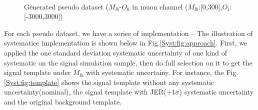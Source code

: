 		\begin{figure}[H]
		\centering
			\\
		\caption{Generated pseudo dataset ($M_{lb}$-$O_6$ in muon channel ($M_{lb}$:[0,300],$O_i$:[-3000,3000])}
		\label{Syst:fig:PD}
		\end{figure}
		\FloatBarrier

		For each pseudo dataset, we have a series of implementation -- The illustration of systematice implementation is shown below in Fig.\ref{Syst:fig:approach}. First, we applied the one standard deviation systematic uncertainty of one kind of systematic on the signal simulation sample, then do full selection on it to get the signal template under $M_{lb}$ with systematic uncertainy. For instance, the Fig.\ref{Syst:fig:template} shows the signal template without any systematic uncertainty(nominal), the signal template with JER(+1$\sigma$) systematic uncertainty and the original background template.

